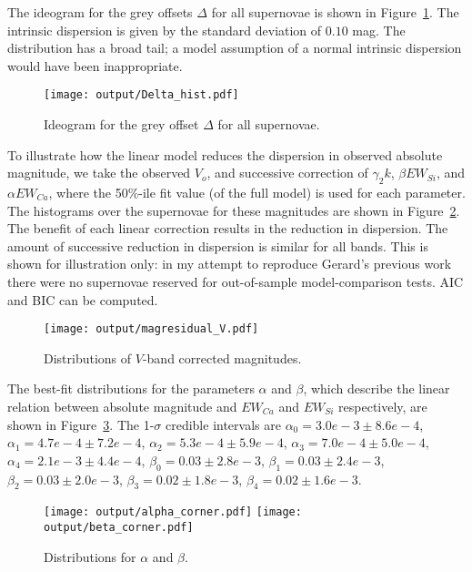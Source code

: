 \documentclass[11pt, oneside]{article}   	%
\begin{document}
The ideogram for the grey offsets $\Delta$ for all supernovae is shown in Figure~\ref{Delta_hist:fig}.  The intrinsic dispersion
is given by the standard deviation of $0.10$ mag.  The distribution has a broad tail; a model assumption of a normal intrinsic dispersion
would have been inappropriate.
\begin{figure}[htbp] %
   \centering
   \texttt{[image: output/Delta\_hist.pdf]} 
   \caption{Ideogram for the grey offset $\Delta$ for all supernovae.}
   \label{Delta_hist:fig}
\end{figure}


To illustrate how the linear model reduces the dispersion in observed absolute magnitude, we take the
observed $V_o$, and successive correction of $\gamma_2k$,  $\beta EW_{Si}$, and  $\alpha EW_{Ca}$, 
where the 50\%-ile fit value (of the full model) is used for each parameter.  The histograms over the supernovae for these magnitudes are shown in
Figure~\ref{magresidual:fig}.  The benefit of each  linear correction results in the reduction in dispersion.  The amount
of successive reduction in dispersion is similar for all bands.  This is shown for illustration only: in my attempt to reproduce Gerard's previous
work there were no supernovae reserved for out-of-sample model-comparison tests.  AIC and BIC can be computed.
\begin{figure}[htbp] %
   \centering
   \texttt{[image: output/magresidual\_V.pdf]} 
   \caption{Distributions of $V$-band corrected magnitudes.}
   \label{magresidual:fig}
\end{figure}

The best-fit distributions for the parameters $\alpha$ and $\beta$, which describe the linear relation between absolute magnitude
and $EW_{Ca}$ and $EW_{Si}$ respectively, are shown in Figure~\ref{alphabeta:fig}.  The 1-$\sigma$ 
credible intervals are $\alpha_0=3.0e-3 \pm 8.6e-4$,
$\alpha_1 = 4.7e-4  \pm 7.2e-4$, $\alpha_2 = 5.3e-4  \pm 5.9e-4$, $\alpha_3 = 7.0e-4  \pm 5.0e-4$,
$\alpha_4 = 2.1e-3  \pm 4.4e-4$,  $\beta_0=0.03  \pm 2.8e-3$,
$\beta_1 =0.03  \pm 2.4e-3$, $\beta_2 = 0.03  \pm 2.0e-3$, $\beta_3 =0.02  \pm 1.8e-3$,
$\beta_4 =0.02  \pm 1.6e-3$.
\begin{figure}[htbp] %
   \centering
   \texttt{[image: output/alpha\_corner.pdf]} 
   \texttt{[image: output/beta\_corner.pdf]} 
   \caption{Distributions for $\alpha$ and $\beta$.}
   \label{alphabeta:fig}
\end{figure}
\end{document}
